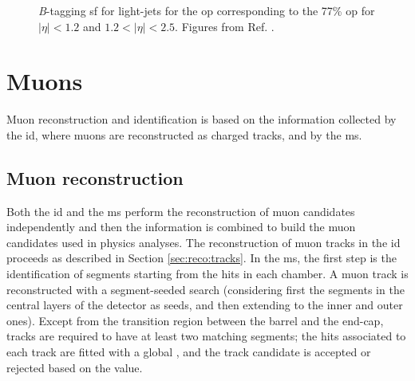 \begin{figure}[htbp]
\begin{center}
\end{center}
 \caption{\textit{B}-tagging \gls{sf} for light-jets for the \gls{op} corresponding to the 77\% \gls{op} for  
 $|\eta|<1.2$ and  $1.2 < |\eta| < 2.5$. Figures from Ref. \cite{ATLAS-CONF-2018-006}.}
  \label{fig:obj:mistagSF}
\end{figure}


\section{Muons}

Muon reconstruction and identification \cite{Aad:2016jkr} is based on the information collected by the \gls{id}, where muons are reconstructed as charged tracks, and by the \gls{ms}. 

\subsection{Muon reconstruction}

Both the \gls{id} and the \gls{ms} perform the reconstruction
of muon candidates independently and then the information is combined to build the muon candidates used in physics analyses. 
The reconstruction of muon tracks in the \gls{id} proceeds as described in Section \ref{sec:reco:tracks}. In the \gls{ms}, the first step is the identification of segments starting from the hits in each chamber. A muon track is reconstructed with a segment-seeded search (considering first the segments in the central layers of the detector as seeds, and then extending to the inner and outer ones). Except from the transition region between the barrel and the end-cap, tracks are required to have at least two matching segments; the hits associated to each track are fitted with a global \chis, and the track candidate is accepted or rejected based on the \chis value. 

